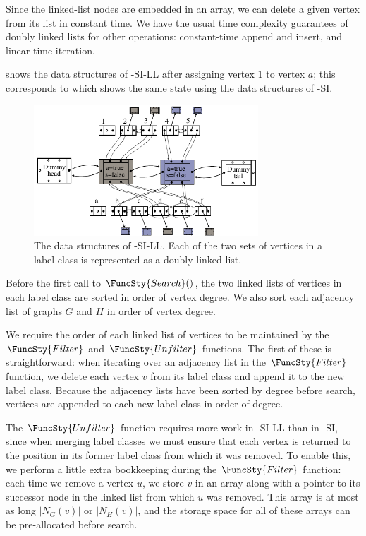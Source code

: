 Since the linked-list nodes are embedded in an array, we can delete a given
vertex from its list in constant time.  We have the usual time complexity
guarantees of doubly linked lists for other operations: constant-time
append and insert, and linear-time iteration.

shows the data structures of \McSplit-SI-LL after assigning vertex $1$ to vertex $a$;
this corresponds to  which shows the same state
using the data structures of \McSplit-SI.

\begin{figure}[htb]
    \centering
    \includegraphics*[width=0.75\textwidth]{14b-mcsplit-induced-si/figs/data-structure-step-1-ll-version}
    \caption{The data structures of \McSplit-SI-LL. Each of the two sets of vertices in a label
        class is represented as a doubly linked list.}
    \label{figure:si-data-structures-ll-version}
\end{figure}

Before the first call to $\FuncSty{Search}()$, the two linked lists of vertices in
each label class are sorted in order of vertex degree.  We also sort each adjacency list
of graphs $G$ and $H$ in order of vertex degree.

We require the order of each linked list of vertices to be maintained
by the $\FuncSty{Filter}$ and $\FuncSty{Unfilter}$ functions.  The first of these is straightforward:
when iterating over an adjacency list in the $\FuncSty{Filter}$ function, we delete each vertex $v$
from its label class and append it to the new label class.  Because the adjacency lists have been sorted
by degree before search, vertices are appended to each new label class in order of degree.

The $\FuncSty{Unfilter}$ function requires more work in \McSplit-SI-LL than in \McSplit-SI,
since when merging label classes we must ensure that each vertex is returned to the position
in its former label class from which it was removed.  To enable this, we perform a little extra
bookkeeping during the $\FuncSty{Filter}$ function: each time we remove a vertex $u$, we store
$v$ in an array along with a pointer to its successor node in the linked list from which $u$
was removed.  This array is at most as long $|N_G(v)|$ or $|N_H(v)|$, and the storage
space for all of these arrays can be pre-allocated before search.

